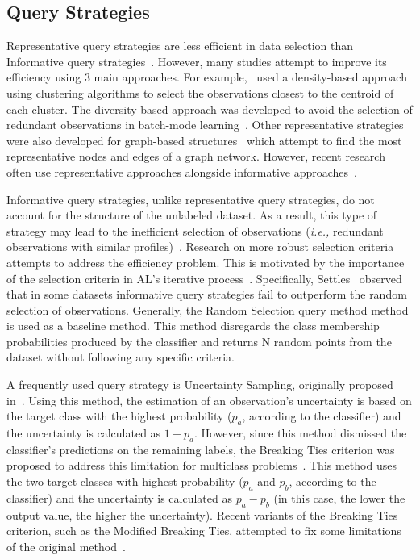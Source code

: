 \documentclass[parskip=full]{scrartcl}
\begin{document}
\subsection{Query Strategies}

Representative query strategies are less efficient in data selection than
Informative query strategies~\cite{Kumar2020}. However, many studies attempt
to improve its efficiency using 3 main approaches. For
example,~\cite{Huang2014, Li2012, Ienco2013} used a density-based approach
using clustering algorithms to select the observations closest to the centroid
of each cluster. The diversity-based approach was developed to avoid the
selection of redundant observations in batch-mode learning~\cite{Brinker2003}.
Other representative strategies were also developed for graph-based
structures~\cite{Jia2019} which attempt to find the most representative nodes
and edges of a graph network. However, recent research often use
representative approaches alongside informative approaches~\cite{Gu2021,
Samat2016}. 

Informative query strategies, unlike representative query strategies, do not
account for the structure of the unlabeled dataset. As a result, this type of
strategy may lead to the inefficient selection of observations (\textit{i.e.,}
redundant observations with similar profiles)~\cite{Kumar2020}. Research on
more robust selection criteria attempts to address the efficiency problem.
This is motivated by the importance of the selection criteria in AL's
iterative process~\cite{Rosario2020}. Specifically, Settles~\cite{Settles2011}
observed that in some datasets informative query strategies fail to outperform
the random selection of observations. Generally, the Random Selection query
method method is used as a baseline method. This method disregards the class
membership probabilities produced by the classifier and returns N random
points from the dataset without following any specific criteria.

A frequently used query strategy is Uncertainty Sampling, originally proposed
in~\cite{Lewis1994}. Using this method, the estimation of an observation's
uncertainty is based on the target class with the highest probability ($p_a$,
according to the classifier) and the uncertainty is calculated as $1-p_a$.
However, since this method dismissed the classifier's predictions on the
remaining labels, the Breaking Ties criterion was proposed to address this
limitation for multiclass problems~\cite{Luo2005}. This method uses the two
target classes with highest probability ($p_a$ and $p_b$, according to the
classifier) and the uncertainty is calculated as $p_a - p_b$ (in this case,
the lower the output value, the higher the uncertainty). Recent variants of
the Breaking Ties criterion, such as the Modified Breaking Ties, attempted to
fix some limitations of the original method~\cite{Liu2018, Li2012a}.
\end{document}
